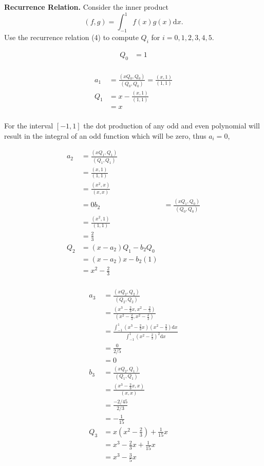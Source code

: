 \textbf{Recurrence Relation.} Consider the inner product \[(f,g) =
\int_{-1}^1 f(x) g(x) \mathrm{d}x.\] Use the recurrence relation (4)
to compute $Q_i$ for $i=0,1,2,3,4,5$.


{\color{blue}

\[
\begin{aligned}
Q_0 &= 1 \\
\end{aligned}
\]

\[
\begin{aligned}
a_1 &= \frac{(x Q_0, Q_0)}{(Q_0, Q_0)} = \frac{(x,1)}{(1,1)} \\
Q_1 &= x - \frac{(x,1)}{(1,1)}  \\
    &= x \\
\end{aligned}
\]

For the interval $[-1, 1]$ the dot production of any odd and even
polynomial will result in the integral of an odd function which will
be zero, thus $a_i = 0$,

\[
\begin{aligned}
a_2 &= \frac{(x Q_1, Q_1)}{(Q_1, Q_1)}\\
    &= \frac{(x,1)}{(1,1)} \\
    &= \frac{(x^2, x)}{(x,x)} \\
    &= 0
b_2 &=  \frac{(x Q_1, Q_0)}{(Q_0, Q_0)} \\
    &=  \frac{(x^2, 1)}{(1,1)} \\
    &=  \frac{2}{3} \\
Q_2 &= (x-a_2) Q_1 - b_2 Q_0 \\
&= (x - a_2) x - b_2 (1) \\
&= x^2 - \frac{2}{3} \\
\end{aligned}
\]

\[
\begin{aligned}
a_3 &= \frac{(x Q_2, Q_2)} {(Q_2, Q_2)}\\
    &= \frac{(x^3 - \frac{2}{3} x, x^2 - \frac{2}{3})}{(x^2 - \frac{2}{3}, x^2 - \frac{2}{3})} \\
    &= \frac{\int_{-1}^1 (x^3 - \frac{2}{3} x) (x^2 - \frac{2}{3}) \textrm{d}x}{\int_{-1}^1 (x^2 - \frac{2}{3})^2 \textrm{d}x}\\
    &= \frac{0}{2/5} \\
    &= 0 \\
b_3 &= \frac{(x Q_2, Q_1)}{(Q_1, Q_1)}\\
    &= \frac{(x^3 - \frac{2}{3}x, x)}{(x,x)}\\
    &= \frac{-2/45}{2/3} \\
    &= -\frac{1}{15} \\
Q_3 &= x(x^2 - \frac{2}{3}) + \frac{1}{15} x \\
    &= x^3 - \frac{2}{3} x + \frac{1}{15} x \\
    &= x^3 - \frac{3}{5} x
\end{aligned}
\]

}
